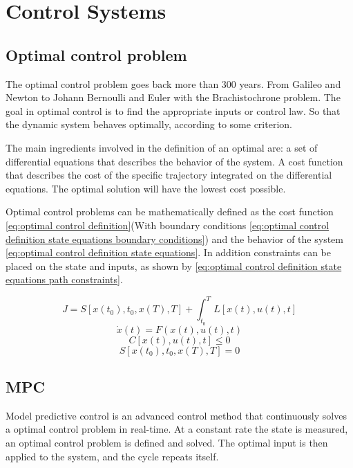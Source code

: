 \chapter{Control Systems}
\section{Optimal control problem}
	The optimal control problem goes back more than 300 years. From Galileo and Newton to Johann Bernoulli and Euler with the Brachistochrone problem. The goal in optimal control is to find the appropriate inputs or control law. So that the dynamic system behaves optimally, according to some criterion. 
	
	The main ingredients involved in the definition of an optimal are: a set of differential equations that describes the behavior of the system. A cost function that describes the cost of the specific trajectory integrated on the differential equations. The optimal solution will have the lowest cost possible.
	
	Optimal control problems can be mathematically defined as the cost function \eqref{eq:optimal control definition}(With boundary conditions \eqref{eq:optimal control definition state equations boundary conditions})  and the behavior of the system \eqref{eq:optimal control definition state equations}. In addition constraints can be placed on the state and inputs, as shown by \eqref{eq:optimal control definition state equations path constraints}. 
	
	\begin{equation}
		J = S[x(t_0),t_0,x(T),T] + \int_{t_0}^{T} L[x(t),u(t),t]
		\label{eq:optimal control definition}
	\end{equation}
	\begin{equation}
		\dot{x}(t) = F(x(t),u(t),t)
		\label{eq:optimal control definition state equations}
	\end{equation}
	\begin{equation}
		C[x(t),u(t),t]\le 0
		\label{eq:optimal control definition state equations path constraints}
	\end{equation}
	\begin{equation}
		S[x(t_0),t_0,x(T),T]=0
		\label{eq:optimal control definition state equations boundary conditions}
	\end{equation}

\section{MPC}
	Model predictive control is an advanced control method that continuously solves a  optimal control problem in real-time. At a constant rate the state is measured, an optimal control problem is defined and solved. The  optimal input is then applied to the system, and the cycle repeats itself.
	
